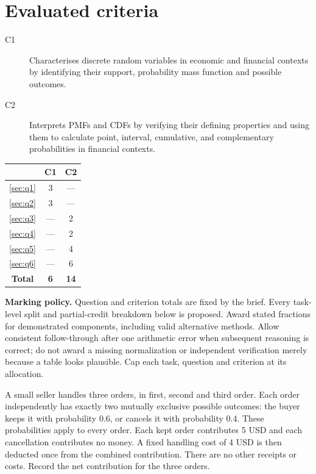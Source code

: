 \section*{Evaluated criteria}
\begin{description}
\item[C1] Characterises discrete random variables in economic and financial contexts by identifying their support, probability mass function and possible outcomes.
\item[C2] Interprets PMFs and CDFs by verifying their defining properties and using them to calculate point, interval, cumulative, and complementary probabilities in financial contexts.
\end{description}

\begin{center}
\begin{tabular}{|c|c|c|}
	\hline\textbf{\textnumero} & \textbf{C1} & \textbf{C2} \\ \hline
	\ref*{sec:q1} & 3 & --- \\\hline
	\ref*{sec:q2} & 3 & --- \\\hline
	\ref*{sec:q3} & --- & 2 \\\hline
	\ref*{sec:q4} & --- & 2 \\\hline
	\ref*{sec:q5} & --- & 4 \\\hline
	\ref*{sec:q6} & --- & 6 \\\hline
	\textbf{Total} & \textbf{6} & \textbf{14} \\\hline
\end{tabular}
\end{center}

\textbf{Marking policy.} Question and criterion totals are fixed by the brief. Every task-level split and partial-credit breakdown below is proposed. Award stated fractions for demonstrated components, including valid alternative methods. Allow consistent follow-through after one arithmetic error when subsequent reasoning is correct; do not award a missing normalization or independent verification merely because a table looks plausible. Cap each task, question and criterion at its allocation.

\clearpage
{}

A small seller handles three orders, in first, second and third order. Each order independently has exactly two mutually exclusive possible outcomes: the buyer keeps it with probability 0.6, or cancels it with probability 0.4. These probabilities apply to every order. Each kept order contributes 5 USD and each cancellation contributes no money. A fixed handling cost of 4 USD is then deducted once from the combined contribution. There are no other receipts or costs. Record the net contribution for the three orders.

